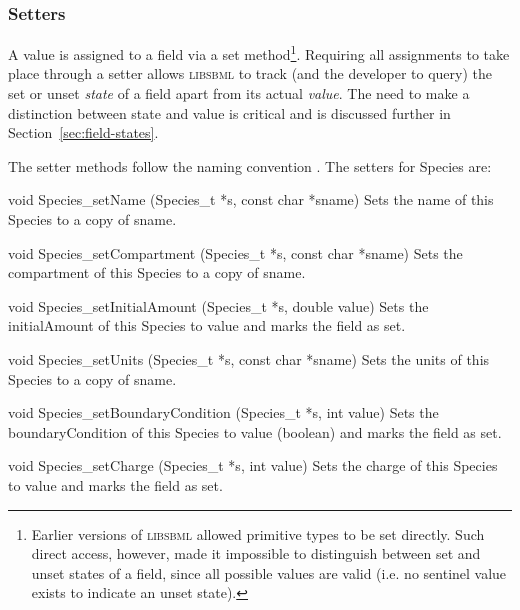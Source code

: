 \documentclass{cekmanual}
\begin{document}
\subsubsection{Setters}

A value is assigned to a field via a set method\footnote{Earlier
versions of \textsc{libsbml} allowed primitive types to be set
directly.  Such direct access, however, made it impossible to
distinguish between set and unset states of a field, since all
possible values are valid (i.e. no sentinel value exists to indicate
an unset state).}.  Requiring all assignments to take place through a
setter allows \textsc{libsbml} to track (and the developer to query)
the set or unset \emph{state} of a field apart from its actual
\emph{value}.  The need to make a distinction between state and value
is critical and is discussed further in
Section~\ref{sec:field-states}.

The setter methods follow the naming convention
.  The setters for Species are:


\begin{methoddef}{void Species\_setName (Species\_t *s, const char *sname)}
  Sets the name of this Species to a copy of sname.
\end{methoddef}

\begin{methoddef}{void Species\_setCompartment (Species\_t *s,
const char *sname)}
  Sets the compartment of this Species to a copy of sname.
\end{methoddef}

\begin{methoddef}{void Species\_setInitialAmount (Species\_t *s, double value)}
  Sets the initialAmount of this Species to value and marks the
  field as set.
\end{methoddef}

\begin{methoddef}{void Species\_setUnits (Species\_t *s, const char *sname)}
  Sets the units of this Species to a copy of sname.
\end{methoddef}

\begin{methoddef}{void Species\_setBoundaryCondition (Species\_t *s, int value)}
  Sets the boundaryCondition of this Species to value (boolean) and marks
  the field as set.
\end{methoddef}

\begin{methoddef}{void Species\_setCharge (Species\_t *s, int value)}
  Sets the charge of this Species to value and marks the field as set.
\end{methoddef}
\end{document}
